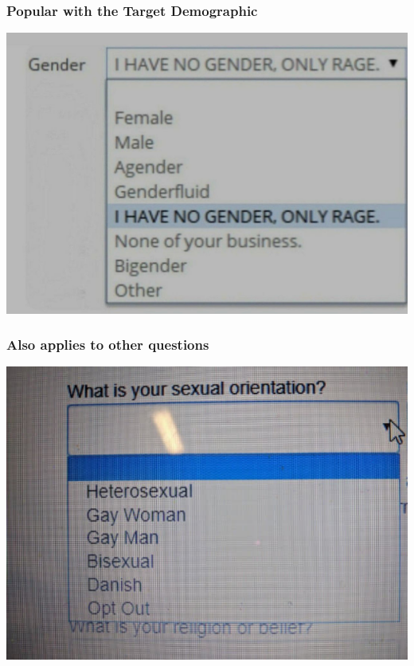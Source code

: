 \documentclass[aspectratio=169,x11names]{beamer}
\begin{document}
\begin{frame}
\frametitle{Popular with the Target Demographic}
\begin{center}
\includegraphics[height=0.725\textheight,keepaspectratio]{images/gender_RAGE.jpg} 
\end{center}
\end{frame}

\begin{frame}
\frametitle{Also applies to other questions}
\begin{center}
\includegraphics[height=0.7\textheight,keepaspectratio]{images/theashencouncil_01.png} 
\end{center}
\end{frame}

\end{document}
